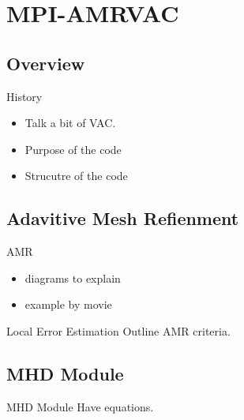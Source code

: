 \documentclass{beamer}
\begin{document}
\section{MPI-AMRVAC}
\subsection{Overview}
\begin{frame}
\begin{block}{History}
\begin{itemize}
\item Talk a bit of VAC.
\item Purpose of the code
\item Strucutre of the code
\end{itemize}
\end{block}
\end{frame}
\subsection{Adavitive Mesh Refienment}
\begin{frame}
\begin{block}{AMR}
\begin{itemize}
\item diagrams to explain
\item example by movie
\end{itemize}
\end{block}
\end{frame}
\begin{frame}
\begin{block}{Local Error Estimation}
Outline AMR criteria.
\end{block}
\end{frame}
\subsection{MHD Module}
\begin{frame}
\begin{block}{MHD Module}
Have equations.
\end{block}
\end{frame}



\end{document}
